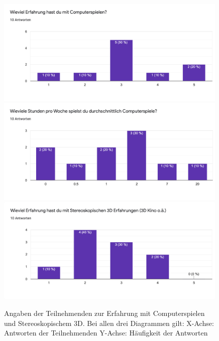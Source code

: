         \begin{figure}[H]
            \centering
            \includegraphics[width=0.99\textwidth]{images/erfahrungpc.png}
            \includegraphics[width=0.99\textwidth]{images/pcstundenprowoche.png}
            \includegraphics[width=0.99\textwidth]{images/3derfahrung.png}
            \caption{Angaben der Teilnehmenden zur Erfahrung mit Computerspielen und Stereoskopischem 3D. Bei allen drei Diagrammen gilt:
            X-Achse: Antworten der Teilnehmenden
            Y-Achse: Häufigkeit der Antworten}\label{figure:videogames}
        \end{figure}

